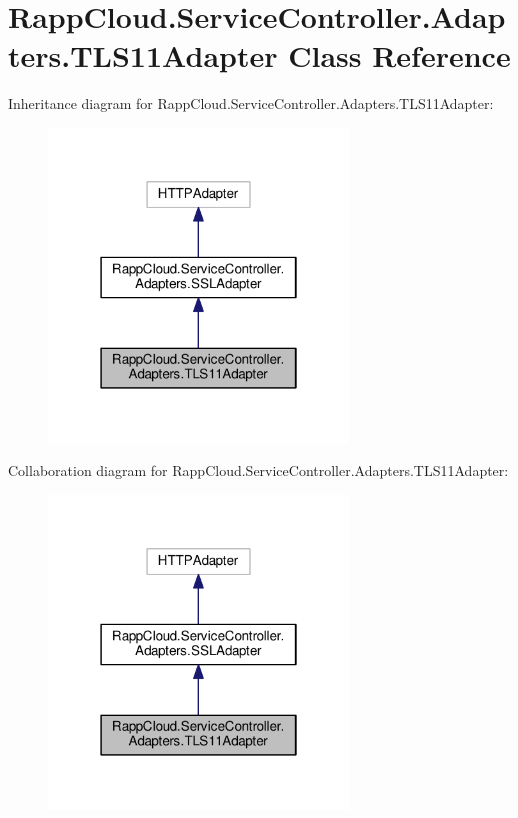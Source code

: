 \hypertarget{classRappCloud_1_1ServiceController_1_1Adapters_1_1TLS11Adapter}{\section{Rapp\-Cloud.\-Service\-Controller.\-Adapters.\-T\-L\-S11\-Adapter Class Reference}
\label{classRappCloud_1_1ServiceController_1_1Adapters_1_1TLS11Adapter}
}


Inheritance diagram for Rapp\-Cloud.\-Service\-Controller.\-Adapters.\-T\-L\-S11\-Adapter\-:
\nopagebreak
\begin{figure}[H]
\begin{center}
\leavevmode
\includegraphics[width=226pt]{classRappCloud_1_1ServiceController_1_1Adapters_1_1TLS11Adapter__inherit__graph}
\end{center}
\end{figure}


Collaboration diagram for Rapp\-Cloud.\-Service\-Controller.\-Adapters.\-T\-L\-S11\-Adapter\-:
\nopagebreak
\begin{figure}[H]
\begin{center}
\leavevmode
\includegraphics[width=226pt]{classRappCloud_1_1ServiceController_1_1Adapters_1_1TLS11Adapter__coll__graph}
\end{center}
\end{figure}
